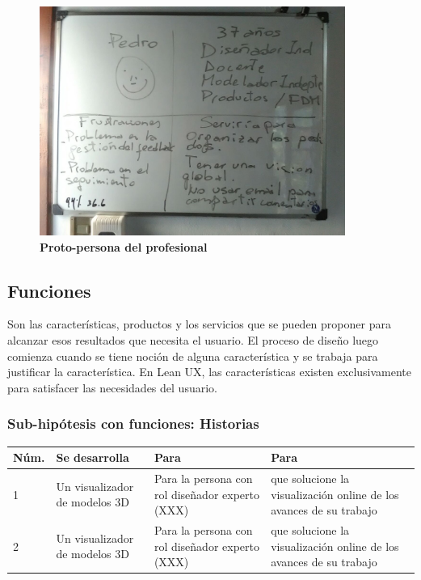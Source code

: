 \begin{figure}[h]
\includegraphics[width=10cm]{Img/UX/UX-proto.jpg}
\centering
\caption{\textbf{ \footnotesize{Proto-persona del profesional}}}
\end{figure}


\subsection{Funciones}
 Son las características, productos y los servicios que se pueden proponer para alcanzar esos resultados que necesita el usuario. El proceso de diseño luego comienza cuando se tiene noción de alguna característica y se trabaja para justificar la característica. En Lean UX, las características existen exclusivamente para satisfacer las necesidades del usuario.

\subsubsection{Sub-hipótesis con funciones: Historias}



\begin{tabular}{ |p{1cm}|p{3.5cm}|p{4.5cm}|p{4.5cm}| }

\hline
    Núm. & Se desarrolla & Para  & Para\\
\hline
1 & Un visualizador de modelos 3D & Para la persona con rol diseñador experto (XXX) & que solucione la visualización online de los avances de su trabajo \\
\hline
2 & Un visualizador de modelos 3D & Para la persona con rol diseñador experto (XXX) & que solucione la visualización online de los avances de su trabajo \\
\hline
\end{tabular}

